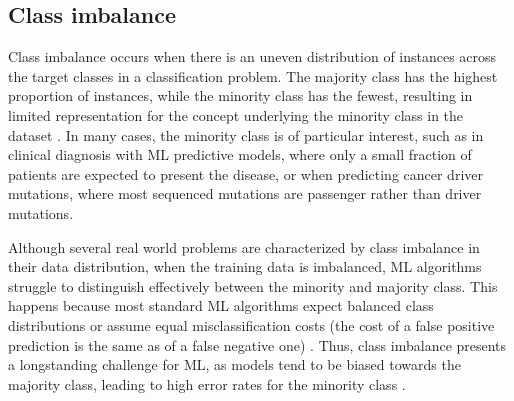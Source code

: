 \subsection{Class imbalance}
\label{sec:background_ClassImbalance}

Class imbalance occurs when there is an uneven distribution of instances across the target classes in a classification problem. The majority class has the highest proportion of instances, while the minority class has the fewest, resulting in limited representation for the concept underlying the minority class in the dataset \cite{he2009learning}. In many cases, the minority class is of particular interest, such as in clinical diagnosis with ML predictive models, where only a small fraction of patients are expected to present the disease, or when predicting cancer driver mutations, where most sequenced mutations are passenger rather than driver mutations.

Although several real world problems are characterized by class imbalance in their data distribution, when the training data is imbalanced, ML algorithms struggle to distinguish effectively between the minority and majority class. This happens because most standard ML algorithms expect balanced class distributions or assume equal misclassification costs (\ie the cost of a false positive prediction is the same as of a false negative one) \cite{he2009learning}. Thus, class imbalance presents a longstanding challenge for ML, as models tend to be biased towards the majority class, leading to high error rates for the minority class \cite{leevy2018survey}. 

